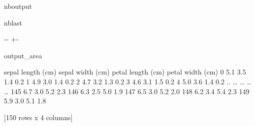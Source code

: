 \documentclass[letterpaper,10pt,dvipdfmx]{sphinxmanual}
\newlength\nbsphinxcodecellspacing
\begin{document}
\begin{sphinxuseclass}{nboutput}
\begin{sphinxuseclass}{nblast}
{

\kern-\sphinxverbatimsmallskipamount\kern-\baselineskip
\kern+\FrameHeightAdjust\kern-\fboxrule
\vspace{\nbsphinxcodecellspacing}

\begin{sphinxuseclass}{output_area}
\begin{sphinxuseclass}{}


\begin{sphinxVerbatim}[commandchars=\\\{\}]
\llap{\color{nbsphinxout}[2]:\,\hspace{\fboxrule}\hspace{\fboxsep}}     sepal length (cm)  sepal width (cm)  petal length (cm)  petal width (cm)
0                  5.1               3.5                1.4               0.2
1                  4.9               3.0                1.4               0.2
2                  4.7               3.2                1.3               0.2
3                  4.6               3.1                1.5               0.2
4                  5.0               3.6                1.4               0.2
..                 {\ldots}               {\ldots}                {\ldots}               {\ldots}
145                6.7               3.0                5.2               2.3
146                6.3               2.5                5.0               1.9
147                6.5               3.0                5.2               2.0
148                6.2               3.4                5.4               2.3
149                5.9               3.0                5.1               1.8

[150 rows x 4 columns]
\end{sphinxVerbatim}



\end{sphinxuseclass}
\end{sphinxuseclass}
}

\end{sphinxuseclass}
\end{sphinxuseclass}
\begin{DUlineblock}{0em}
\item[] 
\end{DUlineblock}
\end{document}
